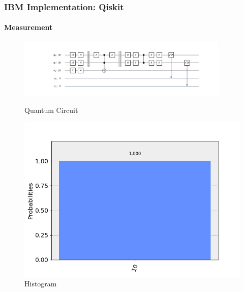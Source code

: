 \begin{frame}
	\frametitle{IBM Implementation: Qiskit}
	\framesubtitle{Measurement}
	\begin{figure}[ht]
		\begin{minipage}[b]{0.75\linewidth}
			\centering
			\includegraphics[trim=190 80 190 0,width=0.9\textwidth]{code/data/images/qiskit-circuit.png}
			\caption{Quantum Circuit}
			\label{fig:a}
		\end{minipage}
		\hspace{0.5cm}
		\begin{minipage}[b]{0.2\linewidth}
			\centering
			\includegraphics[width=\textwidth]{code/data/images/qiskit-histogram.png}
			\caption{Histogram}
			\label{fig:b}
		\end{minipage}
	\end{figure}
\end{frame}

